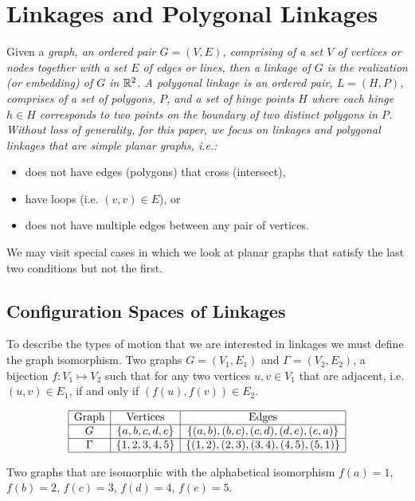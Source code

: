 \section{Linkages and Polygonal Linkages}
Given a \it{graph}, an ordered pair $G = (V,E)$, comprising of a set $V$ of vertices or nodes together with a set $E$ of edges or lines, then a \it{linkage} of $G$ is the realization (or embedding) of $G$ in ${\mathbb{R}}^2$. A \it{polygonal linkage} is an ordered pair, $L = (H,P)$,  comprises of a set of polygons, $P$, and a set of hinge points $H$ where each hinge $h \in H$ corresponds to two points on the boundary of two distinct polygons in $P$. Without loss of generality, for this paper, we focus on linkages and polygonal linkages that are simple planar  graphs, i.e.:
\begin{itemize}
\item[\rn{1}] does not have edges (polygons) that cross (intersect),
\item[\rn{2}] have loops (i.e. $(v,v) \in E$), or
\item[\rn{3}] does not have multiple edges between any pair of vertices.
\end{itemize}
We may visit special cases in which we look at planar graphs that satisfy the last two conditions but not the first.  

\subsection{Configuration Spaces of Linkages}
To describe the types of motion that we are interested in linkages we must define the graph isomorphism.  Two graphs $G=(V_1,E_1)$ and $\Gamma = (V_2,E_2) $, a bijection $f: V_1 \mapsto V_2$ such that for any two vertices $u,v \in V_1$ that are adjacent, i.e. $(u, v) \in E_1$, if and only if $(f(u),f(v)) \in E_2$. 
\begin{table}[!ht]
\begin{center}
$$\begin{array}{|c|c|c|}\hline
\text{Graph}&\text{Vertices}&\text{Edges}\\\hline
G&\left\lbrace a,b,c,d,e \right\rbrace & \left\lbrace (a,b),(b,c),(c,d),(d,e),(e,a) \right\rbrace \\\hline
\Gamma&\left\lbrace 1,2,3,4,5 \right\rbrace & \left\lbrace (1,2),(2,3),(3,4),(4,5),(5,1) \right\rbrace \\\hline
\end{array} $$
\caption{Two graphs that are isomorphic with the alphabetical isomorphism $f(a)=1$, $f(b)=2$, $f(c) = 3$, $f(d)=4$, $f(e)=5$.}
\end{center} 
\label{table:linkage-1}
\end{table} 

